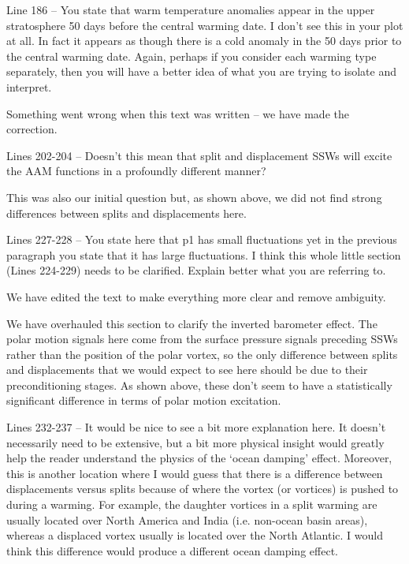 \documentclass[a4paper,10pt]{article}
\begin{document}
\textcolor{reviewer}{Line 186 – You state that warm temperature anomalies appear in the upper stratosphere
50 days before the central warming date. I don’t see this in your plot at all. In fact it
appears as though there is a cold anomaly in the 50 days prior to the central warming
date. Again, perhaps if you consider each warming type separately, then you will have a
better idea of what you are trying to isolate and interpret.}
\vspace{0.5cm}

Something went wrong when this text was written -- we have made the correction.
\vspace{0.5cm}

\textcolor{reviewer}{Lines 202-204 – Doesn’t this mean that split and displacement SSWs will excite the
AAM functions in a profoundly different manner?}
\vspace{0.5cm}

This was also our initial question but, as shown above, we did not find strong differences between splits and displacements here.  
\vspace{0.5cm}


\textcolor{reviewer}{Lines 227-228 – You state here that p1 has small fluctuations yet in the previous
paragraph you state that it has large fluctuations. I think this whole little section (Lines
224-229) needs to be clarified. Explain better what you are referring to.}
\vspace{0.5cm}

We have edited the text to make everything more clear and remove ambiguity.
\vspace{0.5cm}

We have overhauled this section to clarify the inverted barometer effect.  
The polar motion signals here come from the surface pressure signals preceding SSWs rather than the position of the polar vortex, so the only difference between splits and displacements that we would expect to see here should be due to their preconditioning stages.  
As shown above, these don't seem to have a statistically significant difference in terms of polar motion excitation.  
\vspace{0.5cm}

\textcolor{reviewer}{Lines 232-237 – It would be nice to see a bit more explanation here. It doesn’t
necessarily need to be extensive, but a bit more physical insight would greatly help the
reader understand the physics of the ‘ocean damping’ effect. Moreover, this is another
location where I would guess that there is a difference between displacements versus
splits because of where the vortex (or vortices) is pushed to during a warming. For
example, the daughter vortices in a split warming are usually located over North America
and India (i.e. non-ocean basin areas), whereas a displaced vortex usually is located over
the North Atlantic. I would think this difference would produce a different ocean
damping effect.}
\vspace{0.5cm}
\end{document}
